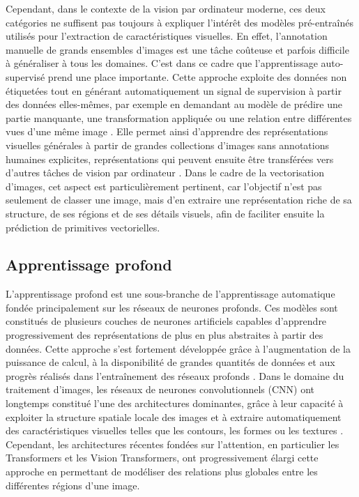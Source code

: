 \documentclass[12pt, a4paper, oneside]{report}
\begin{document}
Cependant, dans le contexte de la vision par ordinateur moderne, ces deux catégories ne suffisent pas toujours à expliquer l'intérêt des modèles pré-entraînés utilisés pour l'extraction de caractéristiques visuelles. En effet, l'annotation manuelle de grands ensembles d'images est une tâche coûteuse et parfois difficile à généraliser à tous les domaines. C'est dans ce cadre que l'apprentissage auto-supervisé prend une place importante. Cette approche exploite des données non étiquetées tout en générant automatiquement un signal de supervision à partir des données elles-mêmes, par exemple en demandant au modèle de prédire une partie manquante, une transformation appliquée ou une relation entre différentes vues d'une même image \cite{jing2021selfsupervised}. Elle permet ainsi d'apprendre des représentations visuelles générales à partir de grandes collections d'images sans annotations humaines explicites, représentations qui peuvent ensuite être transférées vers d'autres tâches de vision par ordinateur \cite{geron2022hands,jing2021selfsupervised}. Dans le cadre de la vectorisation d'images, cet aspect est particulièrement pertinent, car l'objectif n'est pas seulement de classer une image, mais d'en extraire une représentation riche de sa structure, de ses régions et de ses détails visuels, afin de faciliter ensuite la prédiction de primitives vectorielles.

	\subsection{Apprentissage profond}
	L'apprentissage profond est une sous-branche de l'apprentissage automatique fondée principalement sur les réseaux de neurones profonds. Ces modèles sont constitués de plusieurs couches de neurones artificiels capables d'apprendre progressivement des représentations de plus en plus abstraites à partir des données. Cette approche s'est fortement développée grâce à l'augmentation de la puissance de calcul, à la disponibilité de grandes quantités de données et aux progrès réalisés dans l'entraînement des réseaux profonds \cite{geron2022hands}. Dans le domaine du traitement d'images, les réseaux de neurones convolutionnels (CNN) ont longtemps constitué l'une des architectures dominantes, grâce à leur capacité à exploiter la structure spatiale locale des images et à extraire automatiquement des caractéristiques visuelles telles que les contours, les formes ou les textures \cite{lecun1989backpropagation,gonzalez2018digital}. Cependant, les architectures récentes fondées sur l'attention, en particulier les Transformers et les Vision Transformers, ont progressivement élargi cette approche en permettant de modéliser des relations plus globales entre les différentes régions d'une image.
\end{document}
